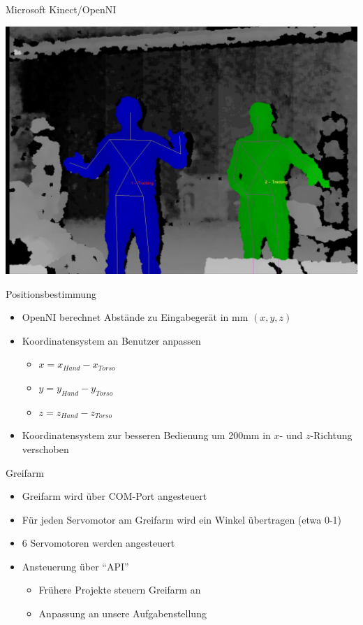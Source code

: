 \begin{frame}{Microsoft Kinect/OpenNI}
\begin{center}
	\includegraphics[height=0.8\textheight]{imgs/multiplayer.jpg}
\end{center}
\end{frame}

\begin{frame}{Positionsbestimmung}
\begin{itemize}
\item OpenNI berechnet Abstände zu Eingabegerät in mm $(x,y,z)$
\item Koordinatensystem an Benutzer anpassen
	\begin{itemize}
	\item $x=x_{Hand}-x_{Torso}$
	\item $y=y_{Hand}-y_{Torso}$
	\item $z=z_{Hand}-z_{Torso}$
	\end{itemize}
\item Koordinatensystem zur besseren Bedienung um 200mm in $x$- und $z$-Richtung verschoben
\end{itemize}
\end{frame}

\begin{frame}{Greifarm}
\begin{itemize}
\item Greifarm wird über COM-Port angesteuert
\item Für jeden Servomotor am Greifarm wird ein Winkel übertragen (etwa 0-1)
\item 6 Servomotoren werden angesteuert
\item Ansteuerung über "`API"'
	\begin{itemize}
	\item Frühere Projekte steuern Greifarm an
	\item Anpassung an unsere Aufgabenstellung
	\end{itemize}
\end{itemize}
\end{frame}
